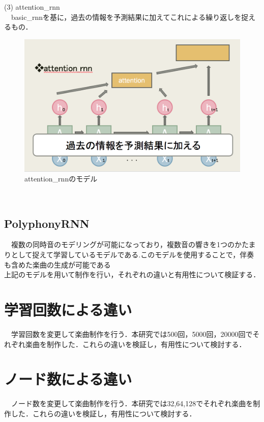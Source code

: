 \newpage
(3) attention\_rnn\\
　basic\_rnnを基に，過去の情報を予測結果に加えてこれによる繰り返しを捉えるもの．\\
\begin{figure}[!ht]
    \begin{screen}
    \begin{center}
        \includegraphics[scale=0.8,clip]{./img/attention1.png}
        \caption{attention\_rnnのモデル}
        \label{fig:attentio_rnnのモデル}
    \end{center}
    \end{screen}
\end{figure}\\
\subsection{PolyphonyRNN}
　複数の同時音のモデリングが可能になっており，複数音の響きを1つのかたまりとして捉えて学習しているモデルである.このモデルを使用することで，伴奏も含めた楽曲の生成が可能である\\
上記のモデルを用いて制作を行い，それぞれの違いと有用性について検証する．
\newpage
\section{学習回数による違い}
　学習回数を変更して楽曲制作を行う．本研究では500回，5000回，20000回でそれぞれ楽曲を制作した．これらの違いを検証し，有用性について検討する．
\section{ノード数による違い}
　ノード数を変更して楽曲制作を行う．本研究では32,64,128でそれぞれ楽曲を制作した．これらの違いを検証し，有用性について検討する．